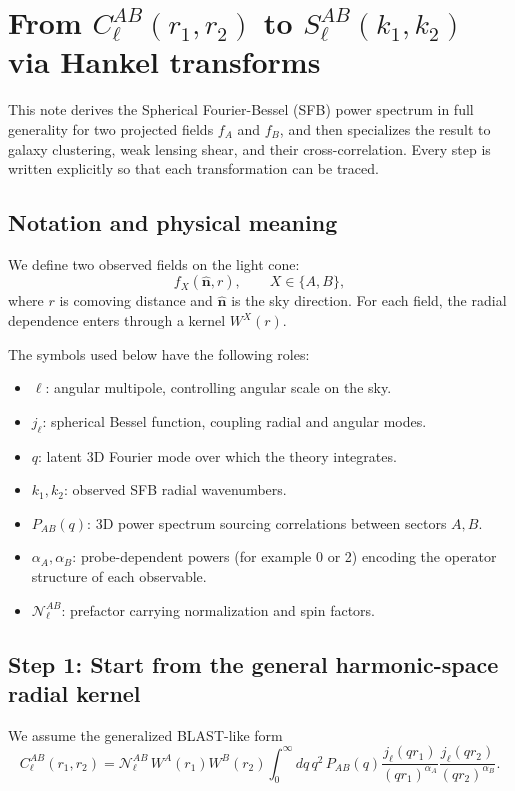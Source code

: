 \section{From $C_\ell^{AB}(r_1,r_2)$ to $S_\ell^{AB}(k_1,k_2)$ via Hankel transforms}

This note derives the Spherical Fourier-Bessel (SFB) power spectrum in full
generality for two projected fields $f_A$ and $f_B$, and then specializes the
result to galaxy clustering, weak lensing shear, and their cross-correlation.
Every step is written explicitly so that each transformation can be traced.

\subsection{Notation and physical meaning}

We define two observed fields on the light cone:
\begin{equation}
f_X(\hat{\mathbf n},r),\qquad X\in\{A,B\},
\end{equation}
where $r$ is comoving distance and $\hat{\mathbf n}$ is the sky direction.
For each field, the radial dependence enters through a kernel $W^X(r)$.

The symbols used below have the following roles:
\begin{itemize}
\item $\ell$: angular multipole, controlling angular scale on the sky.
\item $j_\ell$: spherical Bessel function, coupling radial and angular modes.
\item $q$: latent 3D Fourier mode over which the theory integrates.
\item $k_1,k_2$: observed SFB radial wavenumbers.
\item $P_{AB}(q)$: 3D power spectrum sourcing correlations between sectors $A,B$.
\item $\alpha_A,\alpha_B$: probe-dependent powers (for example 0 or 2) encoding
the operator structure of each observable.
\item $\mathcal N_\ell^{AB}$: prefactor carrying normalization and spin factors.
\end{itemize}

\subsection{Step 1: Start from the general harmonic-space radial kernel}

We assume the generalized BLAST-like form
\begin{equation}
C_\ell^{AB}(r_1,r_2)
= \mathcal N_\ell^{AB}\,W^A(r_1)W^B(r_2)
\int_0^{\infty} dq\,q^2\,P_{AB}(q)
\frac{j_\ell(qr_1)}{(qr_1)^{\alpha_A}}
\frac{j_\ell(qr_2)}{(qr_2)^{\alpha_B}}.
\label{eq:gen_c_ell_rr}
\end{equation}

